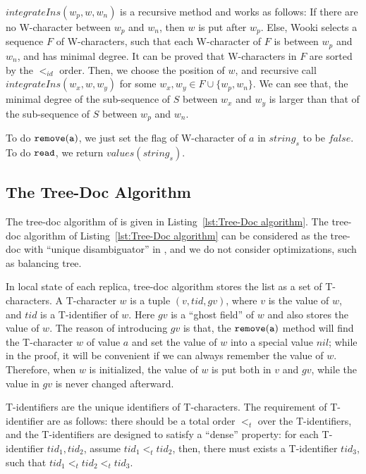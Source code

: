 $integrateIns(w_p,w,w_n)$ is a recursive method and works as follows: If there are no W-character between $w_p$ and $w_n$, then $w$ is put after $w_p$. Else, Wooki selects a sequence $F$ of W-characters, such that each W-character of $F$ is between $w_p$ and $w_n$, and has minimal degree. It can be proved that W-characters in $F$ are sorted by the $<_{id}$ order. Then, we choose the position of $w$, and recursive call $integrateIns(w_x,w,w_y)$ for some $w_x,w_y \in F \cup \{ w_p,w_n \}$. We can see that, the minimal degree of the sub-sequence of $S$ between $w_x$ and $w_y$ is larger than that of the sub-sequence of $S$ between $w_p$ and $w_n$.

To do $\alabelshort[{\tt remove}]{a}$, we just set the flag of W-character of $a$ in $string_s$ to be $\mathit{false}$. To do ${\tt read}$, we return $values(string_s)$.





\subsection{The Tree-Doc Algorithm}
\label{subsec:the Tree-Doc algorithm}

The tree-doc algorithm of \cite{DBLP:conf/icdcs/PreguicaMSL09,DBLP:journals/corr/abs-0710-1784} is given in Listing~\ref{lst:Tree-Doc algorithm}. The tree-doc algorithm of Listing~\ref{lst:Tree-Doc algorithm} can be considered as the tree-doc with ``unique disambiguator'' in \cite{DBLP:conf/icdcs/PreguicaMSL09,DBLP:journals/corr/abs-0710-1784}, and we do not consider optimizations, such as balancing tree.

In local state of each replica, tree-doc algorithm stores the list as a set of T-characters. A T-character $w$ is a tuple $(v,tid,gv)$, where $v$ is the value of $w$, and $tid$ is a T-identifier of $w$. Here $gv$ is a ``ghost field'' of $w$ and also stores the value of $w$. The reason of introducing $gv$ is that, the $\alabelshort[{\tt remove}]{a}$ method will find the T-character $w$ of value $a$ and set the value of $w$ into a special value $nil$; while in the proof, it will be convenient if we can always remember the value of $w$. Therefore, when $w$ is initialized, the value of $w$ is put both in $v$ and $gv$, while the value in $gv$ is never changed afterward.

T-identifiers are the unique identifiers of T-characters. The requirement of T-identifier are as follows: there should be a total order $<_t$ over the T-identifiers, and the T-identifiers are designed to satisfy a ``dense'' property: for each T-identifier $tid_1,tid_2$, assume $tid_1 <_t tid_2$, then, there must exists a T-identifier $tid_3$, such that $tid_1 <_t tid_2 <_t tid_3$.

